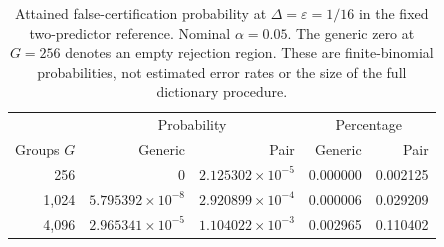 \begin{table}[tb]
\centering\small
\caption{Attained false-certification probability at $\Delta=\varepsilon=1/16$ in the fixed two-predictor reference. Nominal $\alpha=0.05$. The generic zero at $G=256$ denotes an empty rejection region. These are finite-binomial probabilities, not estimated error rates or the size of the full dictionary procedure.}\label{tab:attained}
\begin{tabular}{@{}rrrrr@{}}
\toprule
&\multicolumn{2}{c}{Probability}&\multicolumn{2}{c}{Percentage}\\
Groups $G$&Generic&Pair&Generic&Pair\\
\midrule
256 & $0$ & $2.125302\times10^{-5}$ & 0.000000 & 0.002125\\
1,024 & $5.795392\times10^{-8}$ & $2.920899\times10^{-4}$ & 0.000006 & 0.029209\\
4,096 & $2.965341\times10^{-5}$ & $1.104022\times10^{-3}$ & 0.002965 & 0.110402\\
\bottomrule\end{tabular}\end{table}

